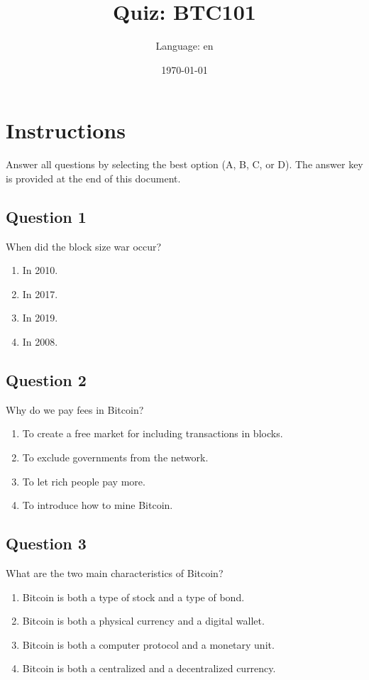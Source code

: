 \documentclass[12pt,a4paper]{article}
\title{Quiz: BTC101}
\author{Language: en}
\date{\today}
\begin{document}
\maketitle
\thispagestyle{fancy}

\section*{Instructions}
Answer all questions by selecting the best option (A, B, C, or D). The answer key is provided at the end of this document.

\bigskip


\subsection*{Question 1}
When did the block size war occur?

\begin{enumerate}[label=\Alph*., leftmargin=*]
\item In 2010.
\item In 2017.
\item In 2019.
\item In 2008.
\end{enumerate}

\bigskip


\subsection*{Question 2}
Why do we pay fees in Bitcoin?

\begin{enumerate}[label=\Alph*., leftmargin=*]
\item To create a free market for including transactions in blocks.
\item To exclude governments from the network.
\item To let rich people pay more.
\item To introduce how to mine Bitcoin.
\end{enumerate}

\bigskip


\subsection*{Question 3}
What are the two main characteristics of Bitcoin?

\begin{enumerate}[label=\Alph*., leftmargin=*]
\item Bitcoin is both a type of stock and a type of bond.
\item Bitcoin is both a physical currency and a digital wallet.
\item Bitcoin is both a computer protocol and a monetary unit.
\item Bitcoin is both a centralized and a decentralized currency.
\end{enumerate}
\end{document}
